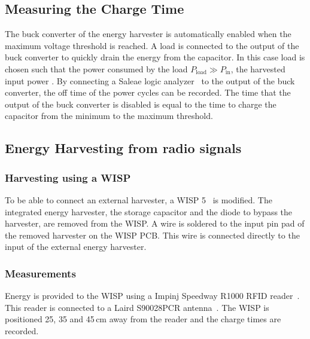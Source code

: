 

\subsection{Measuring the Charge Time}

The buck converter of the energy harvester is automatically enabled when the maximum voltage threshold is reached.
A load is connected to the output of the buck converter to quickly drain the energy from the capacitor.
In this case load is chosen such that the power consumed by the load $P_{\text{load}} \gg P_{\text{in}}$, the harvested input power .
By connecting a Saleae logic analyzer~\cite{saleae_2017} to the output of the buck converter, the off time of the power cycles can be recorded.
The time that the output of the buck converter is disabled is equal to the time to charge the capacitor from the minimum to the maximum threshold.

\subsection{Energy Harvesting from radio signals}

\subsubsection{Harvesting using a WISP}
To be able to connect an external harvester, a WISP 5~\cite{sample_transim_2008} is modified.
The integrated energy harvester, the storage capacitor and the diode to bypass the harvester, are removed from the WISP.
A wire is soldered to the input pin pad of the removed harvester on the WISP PCB.
This wire is connected directly to the input of the external energy harvester.

\subsubsection{Measurements}
Energy is provided to the WISP using a Impinj Speedway R1000 RFID reader~\cite{impinj_eol_2017, indy_r1000_2017}.
This reader is connected to a Laird S90028PCR antenna~\cite{laird_s9028pcr_2017}.
The WISP is positioned 25, 35 and 45\,cm away from the reader and the charge times are recorded.

